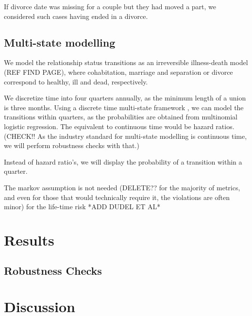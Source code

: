 \documentclass[a4paper,12pt,bibliography=totoc,numbers=noenddot,sfdefaults=false,abstract=true,notitlepage]{scrartcl} %
\begin{document}
	If divorce date was missing for a couple but they had moved a part, we considered such cases having ended in a divorce.

	\subsection{Multi-state modelling}

	We model the relationship status transitions as an irreversible illness-death model \autocite{cookMultistateModelsAnalysis2017} (REF FIND PAGE), where cohabitation, marriage and separation or divorce correspond to healthy, ill and dead, respectively.

	We discretize time into four quarters annually, as the minimum length of a union is three months. Using a discrete time multi-state framework \autocite{dudelet.al.DiscretetimeMultistateModelsUpcoming}, we can model the transitions within quarters, as the probabilities are obtained from multinomial logistic regression. The equivalent to continuous time would be hazard ratios. (CHECK!! As the industry standard for multi-state modelling is continuous time, we will perform robustness checks with that.)
	
	
	Instead of hazard ratio's, we will display the probability of a transition within a quarter. 
	
	The markov assumption is not needed (DELETE?? for the majority of metrics, and even for those that would technically require it, the violations are often minor) for the life-time risk *ADD DUDEL ET AL* %
	
	
	\section{Results}\label{results}
	
	
	
	
	\subsection{Robustness Checks}\label{robustness_checks}
	
	
	
	
	\section{Discussion}\label{discussion}
	
\end{document}
